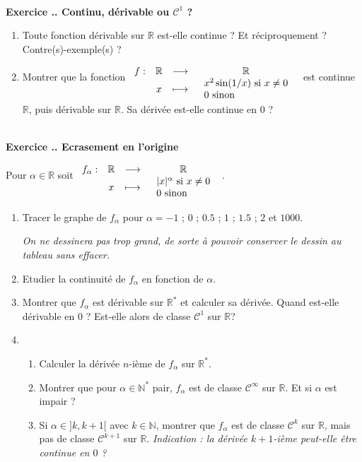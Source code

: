 \documentclass{article}
\newcommand{\fonction}[5]{\raisebox{-0.5\baselineskip}{$\begin{array}{lccc}
    #1: & #2 & \longrightarrow & #3 \\
        & #4 & \longmapsto & #5 \end{array}$}}
\newcommand{\mb}[1]{\mathbb{#1}}
\newcommand{\mc}[1]{\mathcal{#1}}
\newcounter{exo}
\newcommand{\exercice}[1][\null]{\textbf{\\ Exercice \thesection.\theexo. #1} \addtocounter{exo}{1}}
\begin{document}
\exercice[Continu, dérivable ou $\mc{C}^1$ ?]

\begin{enumerate}

\item Toute fonction dérivable sur $\mb{R}$ est-elle continue ? Et réciproquement ? Contre(s)-exemple(s) ?

\item Montrer que la fonction $\fonction{f}{\mb{R}}{\mb{R}}{x}{\begin{tabular}{ll} $x^2 \sin(1/x)$ si $x \neq 0$ \\ $0$ sinon\end{tabular}}$ est continue $\mb{R}$, puis dérivable sur $\mb{R}$. Sa dérivée est-elle continue en $0$ ?
\end{enumerate}




\exercice[Ecrasement en l'origine]

Pour $\alpha \in \mb{R}$ soit $\fonction{f_{\alpha}}{\mb{R}}{\mb{R}}{x}{\begin{tabular}{ll} $|x|^\alpha$ si $x \neq 0$ \\ $0$ sinon\end{tabular}}$.

\begin{enumerate}

\item Tracer le graphe de $f_{\alpha}$ pour $\alpha = -1$ ; $0$ ; $0.5$ ; $1$ ; $1.5$ ; $2$ et $1000$.

\emph{On ne dessinera pas trop grand, de sorte à pouvoir conserver le dessin au tableau sans effacer.}

\item Etudier la continuité de $f_{\alpha}$ en fonction de $\alpha$.

\item Montrer que  $f_{\alpha}$ est dérivable sur $\mb{R}^*$ et calculer sa dérivée. Quand est-elle dérivable en $0$ ? Est-elle alors de classe $\mc{C}^1$ sur $\mb{R}$?

\item 

\begin{enumerate}

\item Calculer la dérivée $n$-ième de $f_{\alpha}$ sur $\mb{R}^*$.


\item Montrer que pour $\alpha \in \mb{N}^*$ pair, $f_\alpha$ est de classe $\mc{C}^{\infty}$ sur $\mb{R}$. Et si $\alpha$ est impair ?

\item Si $\alpha \in ]k,k+1[$ avec $k \in \mb{N}$, montrer que $f_{\alpha}$ est de classe $\mc{C}^k$ sur $\mb{R}$, mais pas de classe $\mc{C}^{k+1}$ sur $\mb{R}$. \emph{Indication : la dérivée $k+1$-ième  peut-elle être continue en $0$ ?}

\end{enumerate}

\end{enumerate}
\end{document}

